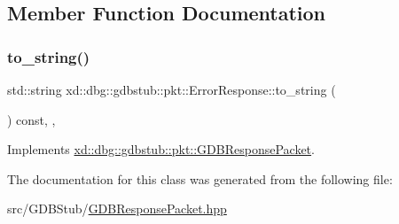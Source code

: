 \subsection{Member Function Documentation}
\mbox{\label{classxd_1_1dbg_1_1gdbstub_1_1pkt_1_1_error_response_aed320a810c6fcf51d67f4d5db4454f61}} 
\subsubsection{\texorpdfstring{to\+\_\+string()}{to\_string()}}
{\footnotesize\ttfamily std\+::string xd\+::dbg\+::gdbstub\+::pkt\+::\+Error\+Response\+::to\+\_\+string (\begin{DoxyParamCaption}{ }\end{DoxyParamCaption}) const\hspace{0.3cm}{\ttfamily [inline]}, {\ttfamily [override]}, {\ttfamily [virtual]}}



Implements \mbox{\hyperlink{classxd_1_1dbg_1_1gdbstub_1_1pkt_1_1_g_d_b_response_packet_a2a15795536cd5ff94f0533c406233874}{xd\+::dbg\+::gdbstub\+::pkt\+::\+G\+D\+B\+Response\+Packet}}.



The documentation for this class was generated from the following file\+:\begin{DoxyCompactItemize}
\item 
src/\+G\+D\+B\+Stub/\mbox{\hyperlink{_g_d_b_response_packet_8hpp}{G\+D\+B\+Response\+Packet.\+hpp}}\end{DoxyCompactItemize}
